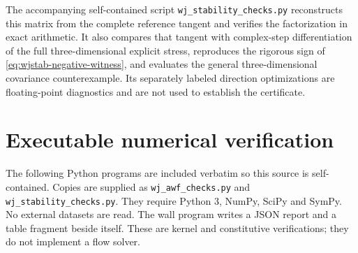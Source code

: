 \documentclass[11pt,a4paper]{article}
\numberwithin{equation}{section}
\begin{document}
The accompanying self-contained script
\texttt{wj\_stability\_checks.py} reconstructs this matrix from the
complete reference tangent and verifies the factorization in exact
arithmetic. It also compares that tangent with complex-step
differentiation of the full three-dimensional explicit stress,
reproduces the rigorous sign of
\eqref{eq:wjstab-negative-witness}, and evaluates the general
three-dimensional covariance counterexample. Its separately labeled
direction optimizations are floating-point diagnostics and are not used
to establish the certificate.


\section{Executable numerical verification}
\label{app:executable}
The following Python programs are included verbatim so this source is
self-contained. Copies are supplied as \texttt{wj\_awf\_checks.py} and
\texttt{wj\_stability\_checks.py}. They require Python 3, NumPy, SciPy
and SymPy. No external datasets are read. The wall program writes a
JSON report and a table fragment beside itself. These are kernel and
constitutive verifications; they do not implement a flow solver.
\end{document}
